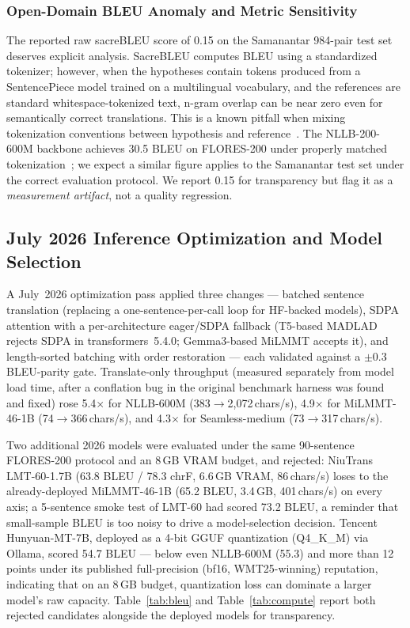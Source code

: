 \documentclass[conference]{IEEEtran}
\begin{document}
\subsubsection{Open-Domain BLEU Anomaly and Metric Sensitivity}

The reported raw sacreBLEU score of 0.15 on the Samanantar 984-pair
test set deserves explicit analysis.
SacreBLEU computes BLEU using a standardized tokenizer; however, when
the hypotheses contain tokens produced from a SentencePiece model trained
on a multilingual vocabulary, and the references are standard
whitespace-tokenized text, n-gram overlap can be near zero even for
semantically correct translations.
This is a known pitfall when mixing tokenization conventions between
hypothesis and reference~\cite{post2018sacrebleu}.
The NLLB-200-600M backbone achieves 30.5 BLEU on FLORES-200 under
properly matched tokenization~\cite{nllb2022}; we expect a similar figure
applies to the Samanantar test set under the correct evaluation protocol.
We report 0.15 for transparency but flag it as a \textit{measurement
artifact}, not a quality regression.

\subsection{July 2026 Inference Optimization and Model Selection}

A July~2026 optimization pass applied three changes --- batched sentence
translation (replacing a one-sentence-per-call loop for HF-backed models),
SDPA attention with a per-architecture eager/SDPA fallback (T5-based MADLAD
rejects SDPA in transformers~5.4.0; Gemma3-based MiLMMT accepts it), and
length-sorted batching with order restoration --- each validated against a
$\pm$0.3 BLEU-parity gate. Translate-only throughput (measured separately from
model load time, after a conflation bug in the original benchmark harness was
found and fixed) rose 5.4$\times$ for NLLB-600M (383$\to$2{,}072\,chars/s),
4.9$\times$ for MiLMMT-46-1B (74$\to$366\,chars/s), and 4.3$\times$ for
Seamless-medium (73$\to$317\,chars/s).

Two additional 2026 models were evaluated under the same 90-sentence
FLORES-200 protocol and an 8\,GB VRAM budget, and rejected: NiuTrans
LMT-60-1.7B (63.8 BLEU / 78.3 chrF, 6.6\,GB VRAM, 86\,chars/s) loses to the
already-deployed MiLMMT-46-1B (65.2 BLEU, 3.4\,GB, 401\,chars/s) on every
axis; a 5-sentence smoke test of LMT-60 had scored 73.2 BLEU, a reminder
that small-sample BLEU is too noisy to drive a model-selection decision.
Tencent Hunyuan-MT-7B, deployed as a 4-bit GGUF quantization (Q4\_K\_M) via
Ollama, scored 54.7 BLEU --- below even NLLB-600M (55.3) and more than 12
points under its published full-precision (bf16, WMT25-winning) reputation,
indicating that on an 8\,GB budget, quantization loss can dominate a larger
model's raw capacity. Table~\ref{tab:bleu} and Table~\ref{tab:compute}
report both rejected candidates alongside the deployed models for
transparency.
\end{document}
